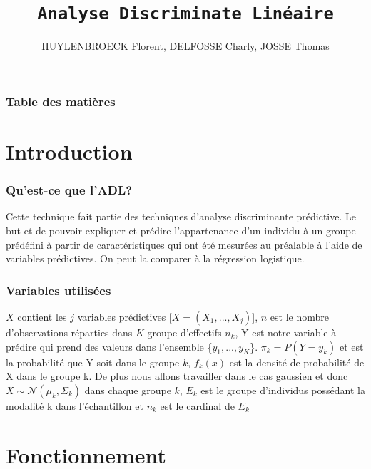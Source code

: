 \documentclass[b]{beamer}
\title{\texttt{Analyse Discriminate Linéaire}}
\author{HUYLENBROECK Florent, DELFOSSE Charly, JOSSE Thomas}
\begin{document}
	\begin{frame}
		\titlepage
	\end{frame}

	\begin{frame}
		\frametitle{Table des matières}
		\tableofcontents
	\end{frame}
	\section{Introduction}
	\begin{frame}
		\frametitle{Qu'est-ce que l'ADL?}
		Cette technique fait partie des techniques d'analyse discriminante prédictive. Le but et de pouvoir expliquer et prédire l'appartenance d'un individu à un groupe prédéfini à partir de caractéristiques qui ont été mesurées au préalable à l'aide de variables prédictives.
		On peut la comparer à la régression logistique. 
	\end{frame}
	\begin{frame}
		\frametitle{Variables utilisées}
			$X$ contient les $j$ variables prédictives [$X = (X_1,...,X_j)$], $n$ est le nombre d'observations réparties dans $K$ groupe d'effectifs $n_k$, Y est notre variable à prédire qui prend des valeurs dans l'ensemble \{$y_1,...,y_K$\}.
			$\pi_k = P(Y = y_k)$ et est la probabilité que Y soit dans le groupe $k$, $f_k(x)$ est la densité de probabilité de X dans le groupe k.
			De plus nous allons travailler dans le cas gaussien et donc $X \sim \mathcal{N}(\mu_k,\Sigma_k)$ dans chaque groupe $k$, $E_k$ est le groupe d'individus possédant la modalité k dans l'échantillon et $n_k$ est le cardinal de $E_k$
	\end{frame}
	\section{Fonctionnement}
\end{document}
